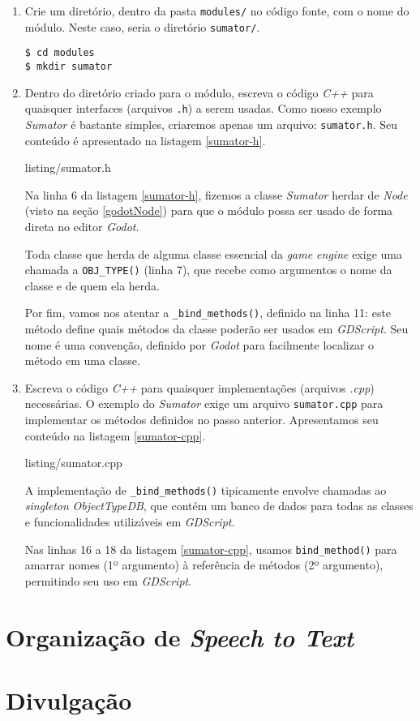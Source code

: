 \begin{enumerate}
\item Crie um diretório, dentro da pasta \texttt{modules/} no código fonte, com o nome do módulo. Neste caso, seria o diretório \texttt{sumator/}.

\begin{lstlisting}
$ cd modules
$ mkdir sumator
\end{lstlisting}

\item Dentro do diretório criado para o módulo, escreva o código \textit{C++} para quaisquer interfaces (arquivos \texttt{.h}) a serem usadas. Como nosso exemplo \textit{Sumator} é bastante simples, criaremos apenas um arquivo: \texttt{sumator.h}. Seu conteúdo é apresentado na listagem \ref{sumator-h}.


{listing/sumator.h}

Na linha 6 da listagem \ref{sumator-h}, fizemos a classe \textit{Sumator} herdar de \textit{Node} (visto na seção \ref{godotNode}) para que o módulo possa ser usado de forma direta no editor \textit{Godot}.

Toda classe que herda de alguma classe essencial da \textit{game engine} exige uma chamada a \texttt{OBJ\_TYPE()} (linha 7), que recebe como argumentos o nome da classe e de quem ela herda.

Por fim, vamos nos atentar a \texttt{\_bind\_methods()}, definido na linha 11: este método define quais métodos da classe poderão ser usados em \textit{GDScript}. Seu nome é uma convenção, definido por \textit{Godot} para facilmente localizar o método em uma classe.

\item Escreva o código \textit{C++} para quaisquer implementações (arquivos \textit{.cpp}) necessárias. O exemplo do \textit{Sumator} exige um arquivo \texttt{sumator.cpp} para implementar os métodos definidos no passo anterior. Apresentamos seu conteúdo na listagem \ref{sumator-cpp}.


{listing/sumator.cpp}

A implementação de \texttt{\_bind\_methods()} tipicamente envolve chamadas ao \textit{singleton} \textit{ObjectTypeDB}, que contém um banco de dados para todas as classes e funcionalidades utilizáveis em \textit{GDScript}.

Nas linhas 16 a 18 da listagem \ref{sumator-cpp}, usamos \texttt{bind\_method()} para amarrar nomes (1º argumento) à referência de métodos (2º argumento), permitindo seu uso em \textit{GDScript}.
\end{enumerate}


\section{Organização de \textit{Speech to Text}}


\section{Divulgação}
